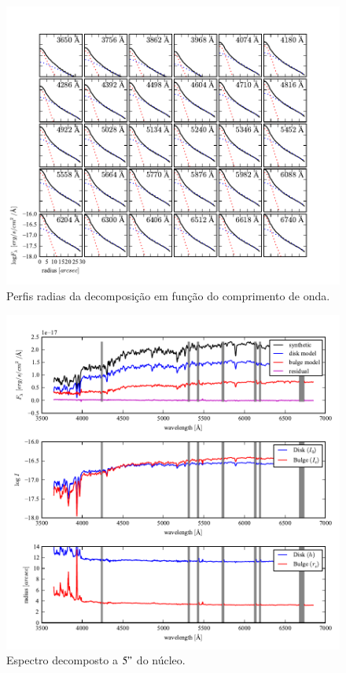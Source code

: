 \begin{figure}
	\includegraphics{figuras/decomp-radial-profile}
	\caption[Perfis radias da decomposição em função do comprimento de onda]
	{Perfis radias da decomposição em função do comprimento de onda.}
	\label{fig:decompRadprof}
\end{figure}

\begin{figure}
	\includegraphics{figuras/decomp-model-quality}
	\caption[Espectro decomposto a $5"$ do núcleo] {Espectro decomposto a $5"$ do
	núcleo.}
	\label{fig:decompSpectra}
\end{figure}

